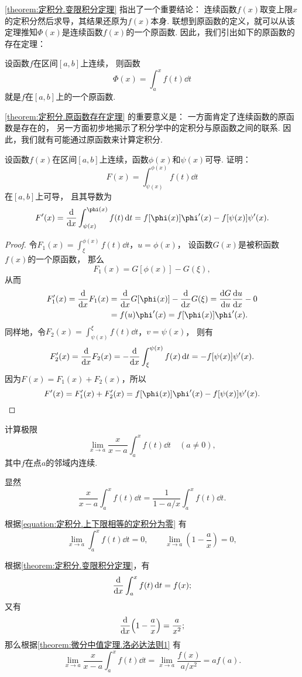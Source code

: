 \cref{theorem:定积分.变限积分定理} 指出了一个重要结论：
连续函数\(f(x)\)取变上限\(x\)的定积分然后求导，其结果还原为\(f(x)\)本身.
联想到原函数的定义，就可以从该定理推知\(\Phi(x)\)是连续函数\(f(x)\)的一个原函数.
因此，我们引出如下的原函数的存在定理：
\begin{theorem}[原函数存在定理]\label{theorem:定积分.原函数存在定理}
设函数\(f\)在区间\([a,b]\)上连续，
则函数\[
	\Phi(x) = \int_a^x f(t) \dd{t}
\]就是\(f\)在\([a,b]\)上的一个原函数.
\end{theorem}
\cref{theorem:定积分.原函数存在定理} 的重要意义是：
一方面肯定了连续函数的原函数是存在的，
另一方面初步地揭示了积分学中的定积分与原函数之间的联系.
因此，我们就有可能通过原函数来计算定积分.

\begin{example}
设函数\(f(x)\)在区间\([a,b]\)上连续，函数\(\phi(x)\)和\(\psi(x)\)可导.
证明：\[
	F(x) = \int_{\psi(x)}^{\phi(x)} f(t) \dd{t}
\]在\([a,b]\)上可导，
且其导数为\begin{equation}\label{equation:定积分.含参变量积分的导数1}
	F'(x) = \dv{x} \int_{\psi(x)}^{\phi(x)} f(t) \dd{t}
	= f[\phi(x)] \phi'(x) - f[\psi(x)] \psi'(x).
\end{equation}
\begin{proof}
令\(F_1(x) = \int_{\xi}^{\phi(x)} f(t) \dd{t}\)，\(u = \phi(x)\)，
设函数\(G(x)\)是被积函数\(f(x)\)的一个原函数，
那么\[
	F_1(x) = G[\phi(x)] - G(\xi),
\]
从而\begin{align*}
	F'_1(x) = \dv{x} F_1(x)
	&= \dv{x} G[\phi(x)] - \dv{x} G(\xi) = \dv{G}{u} \dv{u}{x} - 0 \\
	&= f(u) \phi'(x) = f[\phi(x)] \phi'(x).
\end{align*}
同样地，令\(F_2(x) = \int_{\psi(x)}^{\xi} f(t) \dd{t}\)，\(v = \psi(x)\)，
则有\[
	F'_2(x) = \dv{x} F_2(x) = -\dv{x} \int_{\xi}^{\psi(x)} f(x) \dd{t}
	= -f[\psi(x)] \psi'(x).
\]
因为\(F(x) = F_1(x) + F_2(x)\)，所以\[
	F'(x) = F'_1(x) + F'_2(x)
	= f[\phi(x)] \phi'(x) - f[\psi(x)] \psi'(x).
	\qedhere
\]
\end{proof}
\end{example}

\begin{example}
计算极限\[
	\lim_{x \to a} \frac{x}{x-a} \int_a^x f(t) \dd{t}
	\quad(a\neq0),
\]
其中\(f\)在点\(a\)的邻域内连续.
\begin{solution}
显然\[
	\frac{x}{x-a} \int_a^x f(t) \dd{t}
	= \frac1{1 - a/x} \int_a^x f(t) \dd{t}.
\]

根据\cref{equation:定积分.上下限相等的定积分为零} 有\[
	\lim_{x \to a} \int_a^x f(t) \dd{t} = 0, \qquad
	\lim_{x \to a} \left( 1 - \frac{a}{x} \right) = 0,
\]

根据\cref{theorem:定积分.变限积分定理}，有\[
	\dv{x} \int_a^x f(t) \dd{t} = f(x);
\]
又有\[
	\dv{x}(1 - \frac{a}{x}) = \frac{a}{x^2};
\]
那么根据\cref{theorem:微分中值定理.洛必达法则1} 有\[
	\lim_{x \to a} \frac{x}{x-a} \int_a^x f(t) \dd{t}
	= \lim_{x \to a} \frac{f(x)}{a/x^2}
	= a f(a).
\]
\end{solution}
\end{example}

